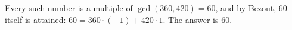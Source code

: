 Every such number is a multiple of $\gcd(360,420)=60$, and by Bezout, $60$ itself is attained: $60=360\cdot(-1)+420\cdot1$. The answer is $\boxed{60}$.
